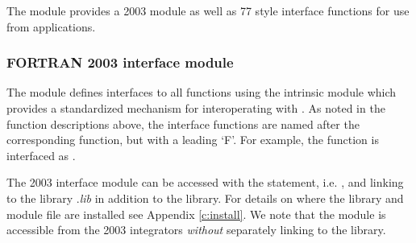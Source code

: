 The {\sunlinsolspbcgs} module provides a {\F} 2003 module as well as {\F} 77
style interface functions for use from {\F} applications.

\subsubsection*{FORTRAN 2003 interface module}
The  {\F} module defines interfaces to all
{\sunlinsolspbcgs} {\CC} functions using the intrinsic 
module which provides a standardized mechanism for interoperating with {\CC}. As
noted in the {\CC} function descriptions above, the interface functions are
named after the corresponding {\CC} function, but with a leading `F'. For
example, the function  is interfaced as
.

The {\F} 2003 {\sunlinsolspbcgs} interface module can be accessed with the 
statement, i.e. , and linking to the library
.{\em lib} in addition to the {\CC} library.
For details on where the library and module file \newline
{} are installed see Appendix \ref{c:install}.
We note that the module is accessible from the {\F} 2003 {\sundials} integrators
\textit{without} separately linking to the \newline
{} library.


